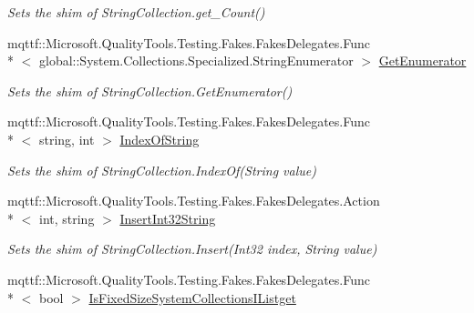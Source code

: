 \begin{DoxyCompactItemize}
\begin{DoxyCompactList}\small\item\em Sets the shim of String\-Collection.\-get\-\_\-\-Count()\end{DoxyCompactList}\item 
mqttf\-::\-Microsoft.\-Quality\-Tools.\-Testing.\-Fakes.\-Fakes\-Delegates.\-Func\\*
$<$ global\-::\-System.\-Collections.\-Specialized.\-String\-Enumerator $>$ \hyperlink{class_system_1_1_collections_1_1_specialized_1_1_fakes_1_1_shim_string_collection_abfe9c74d93bb2cf8868e3ced29fc5d9b}{Get\-Enumerator}
\begin{DoxyCompactList}\small\item\em Sets the shim of String\-Collection.\-Get\-Enumerator()\end{DoxyCompactList}\item 
mqttf\-::\-Microsoft.\-Quality\-Tools.\-Testing.\-Fakes.\-Fakes\-Delegates.\-Func\\*
$<$ string, int $>$ \hyperlink{class_system_1_1_collections_1_1_specialized_1_1_fakes_1_1_shim_string_collection_a12f9d1da274437351bd30577a03cf347}{Index\-Of\-String}
\begin{DoxyCompactList}\small\item\em Sets the shim of String\-Collection.\-Index\-Of(\-String value)\end{DoxyCompactList}\item 
mqttf\-::\-Microsoft.\-Quality\-Tools.\-Testing.\-Fakes.\-Fakes\-Delegates.\-Action\\*
$<$ int, string $>$ \hyperlink{class_system_1_1_collections_1_1_specialized_1_1_fakes_1_1_shim_string_collection_a286b9d37a57e6f75755db9c6126b7f69}{Insert\-Int32\-String}
\begin{DoxyCompactList}\small\item\em Sets the shim of String\-Collection.\-Insert(\-Int32 index, String value)\end{DoxyCompactList}\item 
mqttf\-::\-Microsoft.\-Quality\-Tools.\-Testing.\-Fakes.\-Fakes\-Delegates.\-Func\\*
$<$ bool $>$ \hyperlink{class_system_1_1_collections_1_1_specialized_1_1_fakes_1_1_shim_string_collection_a1a82b69f96fdf483ab33e8d4ab107f7f}{Is\-Fixed\-Size\-System\-Collections\-I\-Listget}

\end{DoxyCompactItemize}
